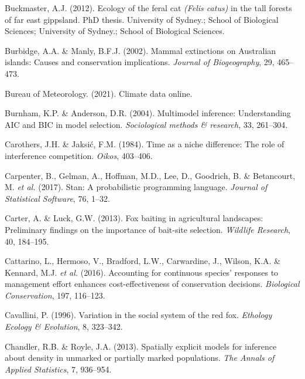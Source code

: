 \documentclass[11pt,a4paper,titlepage,twoside,openright]{style/unimelbthesis}
\begin{document}
\begin{mainmatter}
\leavevmode\hypertarget{ref-buckmaster2012ecology}{}%
Buckmaster, A.J. (2012). Ecology of the feral cat \emph{(Felis catus)} in the tall forests of far east gippsland. PhD thesis. University of Sydney.; School of Biological Sciences; University of Sydney.; School of Biological Sciences.

\leavevmode\hypertarget{ref-burbidge2002mammal}{}%
Burbidge, A.A. \& Manly, B.F.J. (2002). Mammal extinctions on Australian islands: Causes and conservation implications. \emph{Journal of Biogeography}, 29, 465--473.

\leavevmode\hypertarget{ref-BOM2021}{}%
Bureau of Meteorology. (2021). Climate data online.

\leavevmode\hypertarget{ref-burnham2004multimodel}{}%
Burnham, K.P. \& Anderson, D.R. (2004). Multimodel inference: Understanding AIC and BIC in model selection. \emph{Sociological methods \& research}, 33, 261--304.

\leavevmode\hypertarget{ref-carothers1984time}{}%
Carothers, J.H. \& Jaksić, F.M. (1984). Time as a niche difference: The role of interference competition. \emph{Oikos}, 403--406.

\leavevmode\hypertarget{ref-carpenter2017stan}{}%
Carpenter, B., Gelman, A., Hoffman, M.D., Lee, D., Goodrich, B. \& Betancourt, M. \emph{et al.} (2017). Stan: A probabilistic programming language. \emph{Journal of Statistical Software}, 76, 1--32.

\leavevmode\hypertarget{ref-carter2013fox}{}%
Carter, A. \& Luck, G.W. (2013). Fox baiting in agricultural landscapes: Preliminary findings on the importance of bait-site selection. \emph{Wildlife Research}, 40, 184--195.

\leavevmode\hypertarget{ref-cattarino2016accounting}{}%
Cattarino, L., Hermoso, V., Bradford, L.W., Carwardine, J., Wilson, K.A. \& Kennard, M.J. \emph{et al.} (2016). Accounting for continuous species' responses to management effort enhances cost-effectiveness of conservation decisions. \emph{Biological Conservation}, 197, 116--123.

\leavevmode\hypertarget{ref-cavallini1996variation}{}%
Cavallini, P. (1996). Variation in the social system of the red fox. \emph{Ethology Ecology \& Evolution}, 8, 323--342.

\leavevmode\hypertarget{ref-chandler2013spatially}{}%
Chandler, R.B. \& Royle, J.A. (2013). Spatially explicit models for inference about density in unmarked or partially marked populations. \emph{The Annals of Applied Statistics}, 7, 936--954.


\end{mainmatter}
\end{document}
